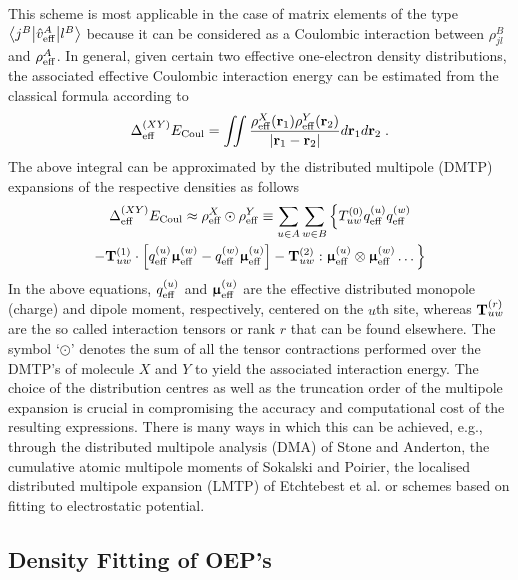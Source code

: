 This scheme is most applicable in the case of matrix elements of the type
$
 \bigl\langle {j^B} \bigl\lvert {\hat{v}_{\rm eff}^A} \bigl\lvert {l^B} \bigr\rangle
$
because it can be considered as a Coulombic interaction between $\rho^B_{jl}$
and $\rho^A_{\rm eff}$. 
In general, given certain two effective one\hyp{}electron density distributions,
the associated effective Coulombic interaction energy can be estimated from the classical formula
according to
%
\begin{equation}
 \Delta^{(XY)}_{\rm eff} E_{\rm Coul} = \iint \frac{\rho_{\rm eff}^X({\bf r}_1) \rho_{\rm eff}^Y({\bf r}_2)}
 {\vert {\bf r}_1 - {\bf r}_2 \vert} 
d{\bf r}_1 d{\bf r}_2 \;.
\end{equation}
%
The above integral can be approximated by the
distributed multipole (DMTP)
expansions of the respective densities as follows
%
\begin{multline}
  \Delta^{(XY)}_{\rm eff} E_{\rm Coul} \approx
 \rho_{\rm eff}^X \odot \rho_{\rm eff}^Y \equiv
 \sum_{u\in A} \sum_{w\in B} \Big\{ 
 T^{(0)}_{uw}
 q_{\rm eff}^{(u)}  q_{\rm eff}^{(w)} \\
 - {\bf T}^{(1)}_{uw} \cdot 
   \left[ q_{\rm eff}^{(u)} {\bm{\upmu}}_{\rm eff}^{(w)} - q_{\rm eff}^{(w)} {\bm{\upmu}}_{\rm eff}^{(u)} \right]
 - {\bf T}^{(2)}_{uw} : 
  {\bm{\upmu}}_{\rm eff}^{(u)}  \otimes {\bm{\upmu}}_{\rm eff}^{(w)} 
 \ldots
 \Big\}
\end{multline}
%
In the above equations, $q_{\rm eff}^{(u)}$ and ${\bm{\upmu}}^{(u)}_{\rm eff}$ 
are the effective distributed monopole (charge)
and dipole moment, respectively, centered on the $u$th site, 
whereas ${{\bf T}^{(r)}_{uw}}$ are the so called interaction tensors or rank $r$ 
that can be found elsewhere.
The symbol `$\odot$' denotes the sum of all the tensor contractions
performed over the DMTP's of molecule $X$ and $Y$ to yield the associated interaction energy.
The choice of the distribution centres as well as the truncation order of the multipole expansion
is crucial in compromising the accuracy and computational cost of the resulting expressions.
There is many ways in which this can be achieved, e.g., through the distributed multipole analysis (DMA)
of Stone and Anderton, %
the cumulative atomic multipole moments of Sokalski and Poirier, %
the localised distributed multipole expansion (LMTP) of Etchtebest et al. %
or schemes based on fitting to electrostatic potential.

\subsection{\label{s.3344}Density Fitting of OEP's}

